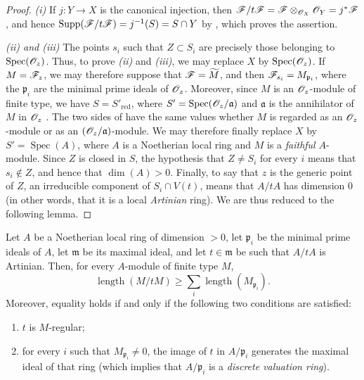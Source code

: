 \begin{proof}
\emph{(i)} If $j:Y\to X$ is the canonical injection, then $\mathscr{F}/t\mathscr{F}
=\mathscr{F}\otimes_{\mathscr{O}_X}\mathscr{O}_Y
=j^*\mathscr{F}$,
and hence $\operatorname{Supp}(\mathscr{F}/t\mathscr{F})
=j^{-1}(S)=S\cap Y$
by , which proves the assertion.

\emph{(ii) and (iii)} The points $s_i$ such that $Z\subset S_i$ are precisely those belonging to $\operatorname{Spec}(\mathscr{O}_z)$.
Thus, to prove \emph{(ii)} and \emph{(iii)}, we may replace $X$ by $\operatorname{Spec}(\mathscr{O}_z)$.
If $M=\mathscr{F}_z$, we may therefore suppose that $\mathscr{F}=\widetilde{M}$, and then $\mathscr{F}_{s_i}=M_{\mathfrak p_i}$, where the $\mathfrak p_i$ are the minimal prime ideals of $\mathscr{O}_z$.
Moreover, since $M$ is an $\mathscr{O}_z$-module of finite type, we have $S=S'_{\mathrm{red}}$, where $S'=\operatorname{Spec}(\mathscr{O}_z/\mathfrak a)$
and $\mathfrak a$ is the annihilator of $M$ in $\mathscr{O}_z$ .
The two sides of  have the same values whether $M$ is regarded as an $\mathscr{O}_z$-module or as an $(\mathscr{O}_z/\mathfrak a)$-module.
We may therefore finally replace $X$ by $S'=\operatorname{Spec}(A)$, where $A$ is a Noetherian local ring and $M$ is a \emph{faithful} $A$-module.
Since $Z$ is closed in $S$, the hypothesis that $Z\neq S_i$ for every $i$ means that $s_i\notin Z$, and hence that $\dim(A)>0$.
Finally, to say that $z$ is the generic point of $Z$, an irreducible component of $S_i\cap V(t)$, means that $A/tA$ has dimension $0$ (in other words, that it is a local \emph{Artinian} ring).
We are thus reduced to the following lemma.
\end{proof}

\begin{lemma}[3.4.1.2]
\label{IV.3.4.1.2}
Let $A$ be a Noetherian local ring of dimension $>0$, let $\mathfrak p_i$ be the minimal prime ideals of $A$, let $\mathfrak m$ be its maximal ideal, and let $t\in\mathfrak m$ be such that $A/tA$ is Artinian.
Then, for every $A$-module of finite type $M$,
\[
\label{IV.3.4.1.3}
\operatorname{length}(M/tM)
  \geqslant
  \sum_i\operatorname{length}(M_{\mathfrak p_i}).
\tag{3.4.1.3}
\]
Moreover, equality holds if and only if the following two conditions are satisfied:
\begin{enumerate}
  \item[\emph{$\alpha$)}] $t$ is $M$-regular;
  \item[\emph{$\beta$)}] for every $i$ such that $M_{\mathfrak p_i}\neq 0$, the image of $t$ in $A/\mathfrak p_i$ generates the maximal ideal of that ring (which implies that $A/\mathfrak p_i$ is a \emph{discrete valuation ring}).
\end{enumerate}
\end{lemma}

